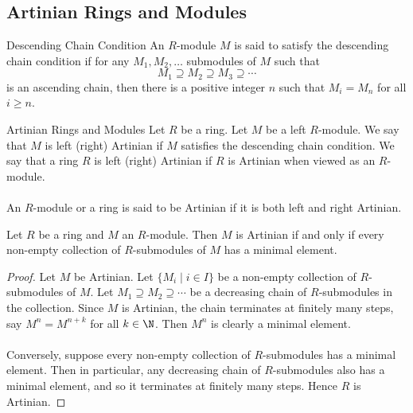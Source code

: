\documentclass[a4paper]{article}
\begin{document}
\subsection{Artinian Rings and Modules}
\begin{defn}{Descending Chain Condition}{} An $R$-module $M$ is said to satisfy the descending chain condition if for any $M_1,M_2,\dots$ submodules of $M$ such that $$M_1\supseteq M_2\supseteq M_3\supseteq\cdots$$ is an ascending chain, then there is a positive integer $n$ such that $M_i=M_n$ for all $i\geq n$. 
\end{defn}

\begin{defn}{Artinian Rings and Modules}{} Let $R$ be a ring. Let $M$ be a left $R$-module. We say that $M$ is left (right) Artinian if $M$ satisfies the descending chain condition. We say that a ring $R$ is left (right) Artinian if $R$ is Artinian when viewed as an $R$-module. \\~\\

An $R$-module or a ring is said to be Artinian if it is both left and right Artinian. 
\end{defn}

\begin{prp}{}{} Let $R$ be a ring and $M$ an $R$-module. Then $M$ is Artinian if and only if every non-empty collection of $R$-submodules of $M$ has a minimal element. \tcbline
\begin{proof}
Let $M$ be Artinian. Let $\{M_i\;|\;i\in I\}$ be a non-empty collection of $R$-submodules of $M$. Let $M_1\supseteq M_2\supseteq\cdots$ be a decreasing chain of $R$-submodules in the collection. Since $M$ is Artinian, the chain terminates at finitely many steps, say $M^n=M^{n+k}$ for all $k\in\N$. Then $M^n$ is clearly a minimal element. \\~\\

Conversely, suppose every non-empty collection of $R$-submodules has a minimal element. Then in particular, any decreasing chain of $R$-submodules also has a minimal element, and so it terminates at finitely many steps. Hence $R$ is Artinian. 
\end{proof}
\end{prp}
\end{document}
